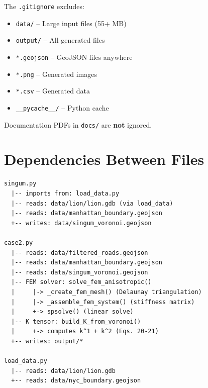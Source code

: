 \documentclass[11pt]{article}
\begin{document}
The \texttt{.gitignore} excludes:

\begin{itemize}[noitemsep]
    \item \texttt{data/} -- Large input files (55+ MB)
    \item \texttt{output/} -- All generated files
    \item \texttt{*.geojson} -- GeoJSON files anywhere
    \item \texttt{*.png} -- Generated images
    \item \texttt{*.csv} -- Generated data
    \item \texttt{\_\_pycache\_\_/} -- Python cache
\end{itemize}

Documentation PDFs in \texttt{docs/} are \textbf{not} ignored.

\section{Dependencies Between Files}

\begin{verbatim}
singum.py
  |-- imports from: load_data.py
  |-- reads: data/lion/lion.gdb (via load_data)
  |-- reads: data/manhattan_boundary.geojson
  +-- writes: data/singum_voronoi.geojson

case2.py
  |-- reads: data/filtered_roads.geojson
  |-- reads: data/manhattan_boundary.geojson
  |-- reads: data/singum_voronoi.geojson
  |-- FEM solver: solve_fem_anisotropic()
  |     |-> _create_fem_mesh() (Delaunay triangulation)
  |     |-> _assemble_fem_system() (stiffness matrix)
  |     +-> spsolve() (linear solve)
  |-- K tensor: build_K_from_voronoi()
  |     +-> computes k^1 + k^2 (Eqs. 20-21)
  +-- writes: output/*

load_data.py
  |-- reads: data/lion/lion.gdb
  +-- reads: data/nyc_boundary.geojson
\end{verbatim}
\end{document}

